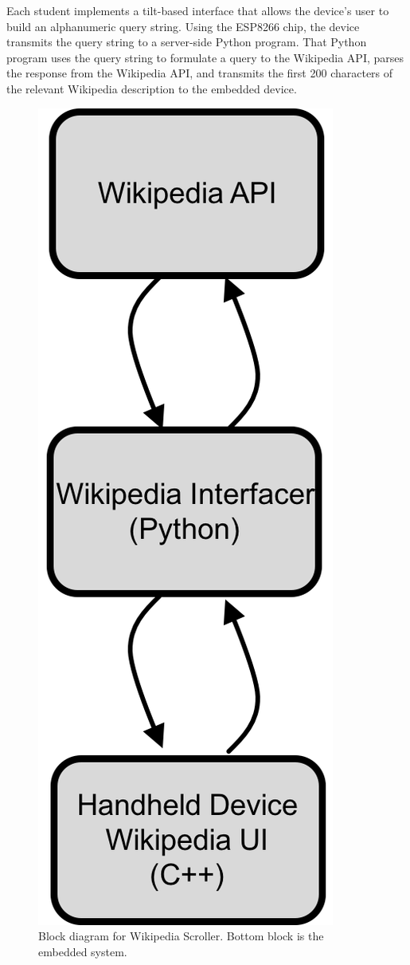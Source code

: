 \documentclass[12pt]{article}
\begin{document}
Each student implements a tilt-based interface that allows the device's user to build an alphanumeric query string.  Using the ESP8266 chip, the device transmits the query string to a server-side Python program.  That Python program uses the query string to formulate a query to the Wikipedia API, parses the response from the Wikipedia API, and transmits the first 200 characters of the relevant Wikipedia description to the embedded device.

\begin{figure}[h]
\centering
\includegraphics[scale=0.5]{wiki-block-diagram.png}
\vspace{5mm}
\caption{Block diagram for Wikipedia Scroller. Bottom block is the embedded system.}
\end{figure}
\end{document}
